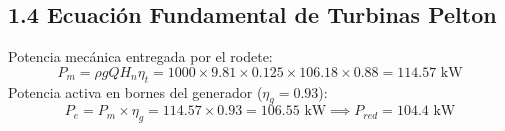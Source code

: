 \documentclass[11pt,a4paper]{article}
\begin{document}
\subsection*{1.4 Ecuación Fundamental de Turbinas Pelton}
Potencia mecánica entregada por el rodete:
\begin{equation}
P_m = \rho g Q H_n \eta_t = 1000 \times 9.81 \times 0.125 \times 106.18 \times 0.88 = 114.57\text{ kW}
\end{equation}
Potencia activa en bornes del generador ($\eta_g = 0.93$):
\begin{equation}
P_e = P_m \times \eta_g = 114.57 \times 0.93 = 106.55\text{ kW} \implies P_{red} = 104.4\text{ kW}
\end{equation}
\end{document}
